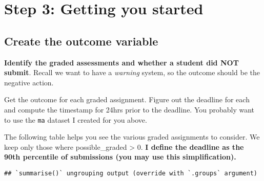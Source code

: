 \documentclass[
]{article}
\newenvironment{Shaded}{\begin{snugshade}}{\end{snugshade}}
\newcommand{\DataTypeTok}[1]{\textcolor[rgb]{0.13,0.29,0.53}{#1}}
\newcommand{\DecValTok}[1]{\textcolor[rgb]{0.00,0.00,0.81}{#1}}
\newcommand{\FloatTok}[1]{\textcolor[rgb]{0.00,0.00,0.81}{#1}}
\newcommand{\KeywordTok}[1]{\textcolor[rgb]{0.13,0.29,0.53}{\textbf{#1}}}
\newcommand{\NormalTok}[1]{#1}
\newcommand{\OperatorTok}[1]{\textcolor[rgb]{0.81,0.36,0.00}{\textbf{#1}}}
\newcommand{\StringTok}[1]{\textcolor[rgb]{0.31,0.60,0.02}{#1}}
\begin{document}
\hypertarget{step-3-getting-you-started}{%
\section{Step 3: Getting you started}\label{step-3-getting-you-started}}

\hypertarget{create-the-outcome-variable}{%
\subsection{Create the outcome
variable}\label{create-the-outcome-variable}}

\textbf{Identify the graded assessments and whether a student did NOT
submit}. Recall we want to have a \emph{warning} system, so the outcome
should be the negative action.

Get the outcome for each graded assignment. Figure out the deadline for
each and compute the timestamp for 24hrs prior to the deadline. You
probably want to use the \texttt{ma} dataset I created for you above.

The following table helps you see the various graded assignments to
consider. We keep only those where possible\_graded \textgreater{} 0.
\textbf{I define the deadline as the 90th percentile of submissions (you
may use this simplification).}

\begin{Shaded}
\end{Shaded}

\begin{verbatim}
## `summarise()` ungrouping output (override with `.groups` argument)
\end{verbatim}
\end{document}
